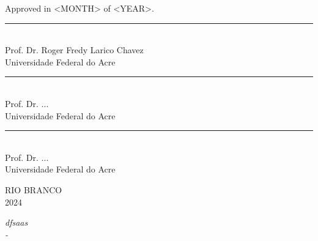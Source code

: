 	Approved in <MONTH> of <YEAR>. \\
	\begin{flushright}
	  \parbox{11cm}
	  {
	    \begin{center}
	      \vspace{3mm}
	      \rule{11cm}{.1mm} \\
	      Prof. Dr. Roger Fredy Larico Chavez\\
	      Universidade Federal do Acre
	      \vspace{3mm}
	    \end{center}
     
     \begin{center}
	      \vspace{3mm}
	      \rule{11cm}{.1mm} \\
	      Prof. Dr. ...\\
	      Universidade Federal do Acre
	      \vspace{3mm}
	    \end{center}
     
     \begin{center}
	      \vspace{3mm}
	      \rule{11cm}{.1mm} \\
	      Prof. Dr. ...\\
	      Universidade Federal do Acre
	      \vspace{3mm}
	    \end{center}
	  }
	\end{flushright}
	
	\begin{center}
	  \vspace{4mm}
	  RIO BRANCO \\
	  2024
	\end{center}
	
	\cleardoublepage
	\thispagestyle{empty}
	\vspace*{200mm}
	
	\begin{flushright}
	  {\em
	dfsaas
	    \\
	   - 
	    \\ 
	    
	  }
	\end{flushright}
	\newpage
	
	\hspace{5mm}
	
